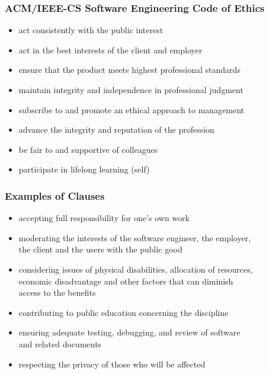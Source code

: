 \documentclass[dvipsnames]{beamer}
\theoremstyle{plain}
\begin{document}
\begin{frame}
  \frametitle{ACM/IEEE-CS Software Engineering Code of Ethics}

  \begin{itemize}
    \item act consistently with the \alert{public} interest
    \item act in the best interests of the \alert{client and employer}
    \item ensure that the \alert{product} meets highest professional standards
    \item maintain integrity and independence in professional \alert{judgment}
    \item subscribe to and promote an ethical approach to \alert{management}
    \item advance the integrity and reputation of the \alert{profession}
    \item be fair to and supportive of \alert{colleagues}
    \item participate in lifelong learning (\alert{self})
  \end{itemize}
\end{frame}

\begin{frame}
  \frametitle{Examples of Clauses}

  \begin{itemize}
    \item accepting full responsibility for one's own work
    \item moderating the interests of the software engineer, the employer,\\
      the client and the users with the public good
    \item considering issues of physical disabilities, allocation of resources,\\
      economic disadvantage and other factors that can diminish\\
      access to the benefits
    \item contributing to public education concerning the discipline
    \item ensuring adequate testing, debugging, and review of software\\
      and related documents
    \item respecting the privacy of those who will be affected
  \end{itemize}
\end{frame}
\end{document}
